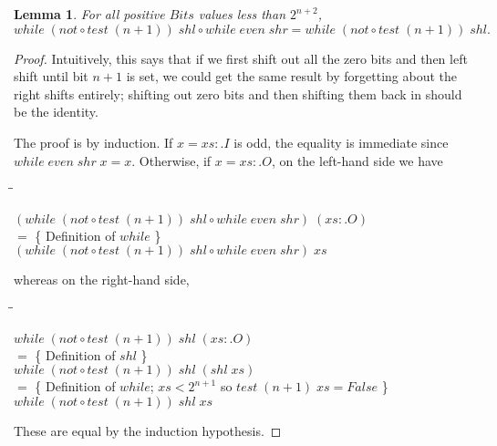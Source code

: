 \documentclass{jfp}
\newcommand{\Conid}[1]{\mathit{#1}}
\newcommand{\Varid}[1]{\mathit{#1}}
\newenvironment{sproof}{%
    \begin{tabbing}
    \phantom{$\equiv$} \= \qquad\qquad\qquad\qquad\qquad \= \kill
}{
    \end{tabbing}
}
\newcommand{\stmt}[1]{\> \ensuremath{#1} \\}
\newcommand{\reason}[2]{\ensuremath{#1} \>\> \{ \quad #2 \quad \} \\}
\newtheorem{lem}[thm]{Lemma}
\theoremstyle{definition}
\theoremstyle{remark}
\begin{document}
\begin{lem} \label{lem:shlshr}
  For all positive \ensuremath{\Conid{Bits}} values less than $2^{n+2}$,
  \[ \ensuremath{\Varid{while}\;(not\mathbin{\circ}\Varid{test}\;(\Varid{n}\mathbin{+}\mathrm{1}))\;\Varid{shl}\mathbin{\circ}\Varid{while}\;\Varid{even}\;\Varid{shr}\mathrel{=}\Varid{while}\;(not\mathbin{\circ}\Varid{test}\;(\Varid{n}\mathbin{+}\mathrm{1}))\;\Varid{shl}}. \]
\end{lem}
\begin{proof}
  Intuitively, this says that if we first shift out all the zero bits
  and then left shift until bit $n+1$ is set, we could get the same
  result by forgetting about the right shifts entirely; shifting out
  zero bits and then shifting them back in should be the identity.

  The proof is by induction.  If \ensuremath{\Varid{x}\mathrel{=}\Varid{xs}\mathrel{:\!.}\Conid{I}} is odd, the equality is
  immediate since \ensuremath{\Varid{while}\;\Varid{even}\;\Varid{shr}\;\Varid{x}\mathrel{=}\Varid{x}}. Otherwise, if \ensuremath{\Varid{x}\mathrel{=}\Varid{xs}\mathrel{:\!.}\Conid{O}},
  on the left-hand side we have
  \begin{sproof}
    \stmt{\ensuremath{(\Varid{while}\;(not\mathbin{\circ}\Varid{test}\;(\Varid{n}\mathbin{+}\mathrm{1}))\;\Varid{shl}\mathbin{\circ}\Varid{while}\;\Varid{even}\;\Varid{shr})\;(\Varid{xs}\mathrel{:\!.}\Conid{O})}}
    \reason{=}{Definition of \ensuremath{\Varid{while}}}
    \stmt{\ensuremath{(\Varid{while}\;(not\mathbin{\circ}\Varid{test}\;(\Varid{n}\mathbin{+}\mathrm{1}))\;\Varid{shl}\mathbin{\circ}\Varid{while}\;\Varid{even}\;\Varid{shr})\;\Varid{xs}}}
  \end{sproof}
  whereas on the right-hand side,
  \begin{sproof}
    \stmt{\ensuremath{\Varid{while}\;(not\mathbin{\circ}\Varid{test}\;(\Varid{n}\mathbin{+}\mathrm{1}))\;\Varid{shl}\;(\Varid{xs}\mathrel{:\!.}\Conid{O})}}
    \reason{=}{Definition of \ensuremath{\Varid{shl}}}
    \stmt{\ensuremath{\Varid{while}\;(not\mathbin{\circ}\Varid{test}\;(\Varid{n}\mathbin{+}\mathrm{1}))\;\Varid{shl}\;(\Varid{shl}\;\Varid{xs})}}
    \reason{=}{Definition of \ensuremath{\Varid{while}}; $\ensuremath{\Varid{xs}} < 2^{n+1}$ so \ensuremath{\Varid{test}\;(\Varid{n}\mathbin{+}\mathrm{1})\;\Varid{xs}\mathrel{=}\Conid{False}} }
    \stmt{\ensuremath{\Varid{while}\;(not\mathbin{\circ}\Varid{test}\;(\Varid{n}\mathbin{+}\mathrm{1}))\;\Varid{shl}\;\Varid{xs}}}
  \end{sproof}
  These are equal by the induction hypothesis.
\end{proof}
\end{document}

